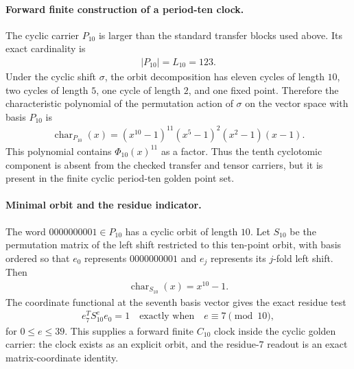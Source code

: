 \paragraph{Forward finite construction of a period-ten clock.}
The cyclic carrier $P_{10}$ is larger than the standard transfer blocks used above. Its exact cardinality is
$$
\begin{aligned}
|P_{10}|=L_{10}=123.
\end{aligned}
$$
Under the cyclic shift $\sigma$, the orbit decomposition has eleven cycles of length $10$, two cycles of length $5$, one cycle of length $2$, and one fixed point. Therefore the characteristic polynomial of the permutation action of $\sigma$ on the vector space with basis $P_{10}$ is
$$
\begin{aligned}
\operatorname{char}_{P_{10}}(x)=(x^{10}-1)^{11}(x^5-1)^2(x^2-1)(x-1).
\end{aligned}
$$
This polynomial contains $\Phi_{10}(x)^{11}$ as a factor. Thus the tenth cyclotomic component is absent from the checked transfer and tensor carriers, but it is present in the finite cyclic period-ten golden point set.

\paragraph{Minimal orbit and the residue indicator.}
The word $0000000001\in P_{10}$ has a cyclic orbit of length $10$. Let $S_{10}$ be the permutation matrix of the left shift restricted to this ten-point orbit, with basis ordered so that $e_0$ represents $0000000001$ and $e_j$ represents its $j$-fold left shift. Then
$$
\begin{aligned}
\operatorname{char}_{S_{10}}(x)=x^{10}-1.
\end{aligned}
$$
The coordinate functional at the seventh basis vector gives the exact residue test
$$
\begin{aligned}
e_7^T S_{10}^e e_0=1\quad\text{exactly when}\quad e\equiv 7\pmod {10},
\end{aligned}
$$
for $0\leq e\leq 39$. This supplies a forward finite $C_{10}$ clock inside the cyclic golden carrier: the clock exists as an explicit orbit, and the residue-$7$ readout is an exact matrix-coordinate identity.

